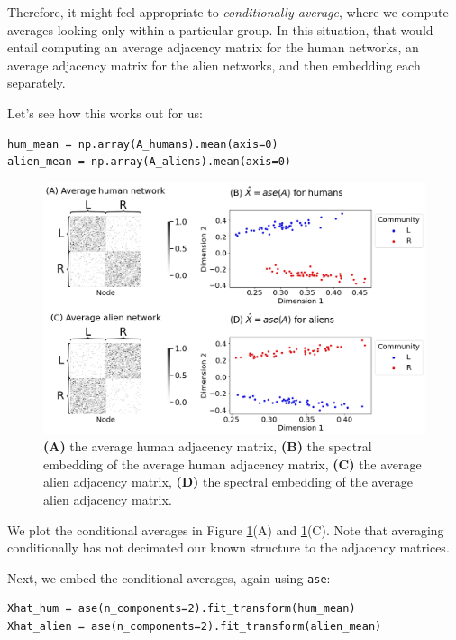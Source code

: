 Therefore, it might feel appropriate to \textit{conditionally average}, where we compute averages looking only within a particular group. In this situation, that would entail computing an average adjacency matrix for the human networks, an average adjacency matrix for the alien networks, and then embedding each separately. 

Let's see how this works out for us:

\begin{lstlisting}[style=python]
hum_mean = np.array(A_humans).mean(axis=0)
alien_mean = np.array(A_aliens).mean(axis=0)
\end{lstlisting}
\begin{figure}[h]
    \centering
    \includegraphics[width=\linewidth]{representations/ch6/Images/cond_avg.png}
    \caption[conditional average embeddings]{\textbf{(A)} the average human adjacency matrix, \textbf{(B)} the spectral embedding of the average human adjacency matrix, \textbf{(C)} the average alien adjacency matrix, \textbf{(D)} the spectral embedding of the average alien adjacency matrix.}
    \label{fig:ch6:multinet:cond_avg}
\end{figure}
We plot the conditional averages in Figure \ref{fig:ch6:multinet:cond_avg}(A) and \ref{fig:ch6:multinet:cond_avg}(C). Note that averaging conditionally has not decimated our known structure to the adjacency matrices.

Next, we embed the conditional averages, again using \texttt{ase}:

\begin{lstlisting}[style=python]
Xhat_hum = ase(n_components=2).fit_transform(hum_mean)
Xhat_alien = ase(n_components=2).fit_transform(alien_mean)
\end{lstlisting}

